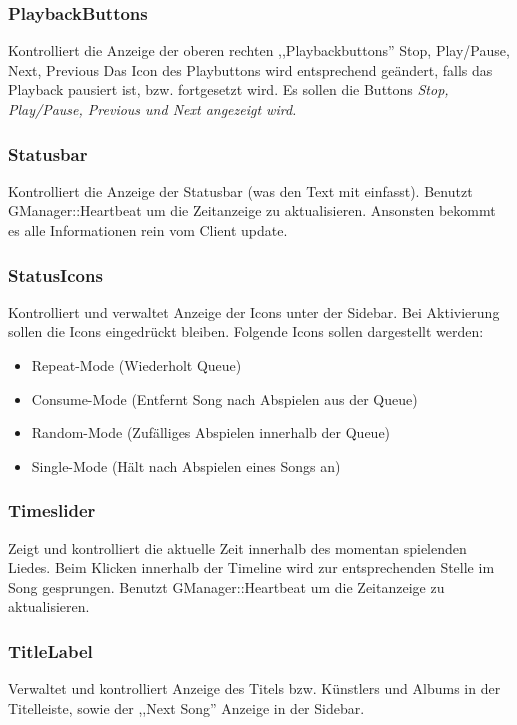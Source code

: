 \subsubsection{PlaybackButtons}
Kontrolliert die Anzeige der oberen rechten ,,Playbackbuttons'' Stop, Play/Pause, Next, Previous
Das Icon des Playbuttons wird entsprechend geändert, falls das Playback pausiert ist,
bzw. fortgesetzt wird. Es sollen die Buttons \it Stop, Play/Pause, Previous und Next \rm angezeigt wird.

\subsubsection{Statusbar}
Kontrolliert die Anzeige der Statusbar (was den Text mit einfasst). 
Benutzt GManager::Heartbeat um die Zeitanzeige zu aktualisieren. Ansonsten bekommt es alle Informationen rein vom Client update.

\subsubsection{StatusIcons}
Kontrolliert und verwaltet Anzeige der Icons unter der Sidebar.
Bei Aktivierung sollen die Icons eingedrückt bleiben.
Folgende Icons sollen dargestellt werden:
\begin{itemize}
\item Repeat-Mode (Wiederholt Queue)
\item Consume-Mode (Entfernt Song nach Abspielen aus der Queue)
\item Random-Mode (Zufälliges Abspielen innerhalb der Queue)
\item Single-Mode (Hält nach Abspielen eines Songs an)
\end{itemize}

\subsubsection{Timeslider}
Zeigt und kontrolliert die aktuelle Zeit innerhalb des momentan spielenden Liedes.
Beim Klicken innerhalb der Timeline wird zur entsprechenden Stelle im Song gesprungen.
Benutzt GManager::Heartbeat um die Zeitanzeige zu aktualisieren.

\subsubsection{TitleLabel}
Verwaltet und kontrolliert Anzeige des Titels bzw. Künstlers und Albums in der Titelleiste, sowie der ,,Next Song'' Anzeige in der Sidebar.

